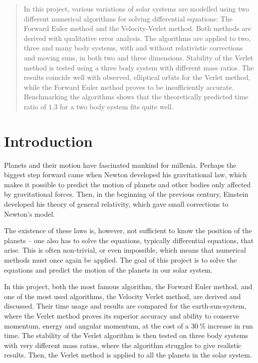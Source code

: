 \documentclass[12pt,english,a4paper]{article}
\begin{document}

\pagestyle{fancy}
\tableofcontents

%

\begin{abstract}
In this project, various variations of solar systems are modelled using two different numerical algorithms for solving differential equations: The Forward Euler method and the Velocity-Verlet method. Both methods are derived with qualitative error analysis. The algorithms are applied to two, three and many body systems, with and without relativistic corrections and moving suns, in both two and three dimensions. Stability of the Verlet method is tested using a three body system with different mass ratios. The results coincide well with observed, elliptical orbits for the Verlet method, while the Forward Euler method proves to be insufficiently accurate. Benchmarking the algorithms shows that the theoretically predicted time ratio of \(\num{1.3}\) for a two body system fits quite well.
\end{abstract}



\clearpage
\section{Introduction}
Planets and their motion have fascinated mankind for millenia. Perhaps the biggest step forward came when Newton developed his gravitational law, which makes it possible to predict the motion of planets and other bodies only affected by gravitational forces. Then, in the beginning of the previous century, Einstein developed his theory of general relativity, which gave small corrections to Newton's model.

The existence of these laws is, however, not sufficient to know the position of the planets -- one also has to solve the equations, typically differential equations, that arise. This is often non-trivial, or even impossible, which means that numerical methods must once again be applied. The goal of this project is to solve the equations and predict the motion of the planets in our solar system.

In this project, both the most famous algorithm, the Forward Euler method, and one of the most used algorithms, the Velocity Verlet method, are derived and discussed. Their time usage and results are compared for the earth-sun-system, where the Verlet method proves its superior accuracy and ability to conserve momentum, energy and angular momentum, at the cost of a \(\SI{30}{\percent}\) increase in run time. The stability of the Verlet algorithm is then tested on three body systems with very different mass ratios, where the algorithm struggles to give realistic results. Then, the Verlet method is applied to all the planets in the solar system.
\end{document}
